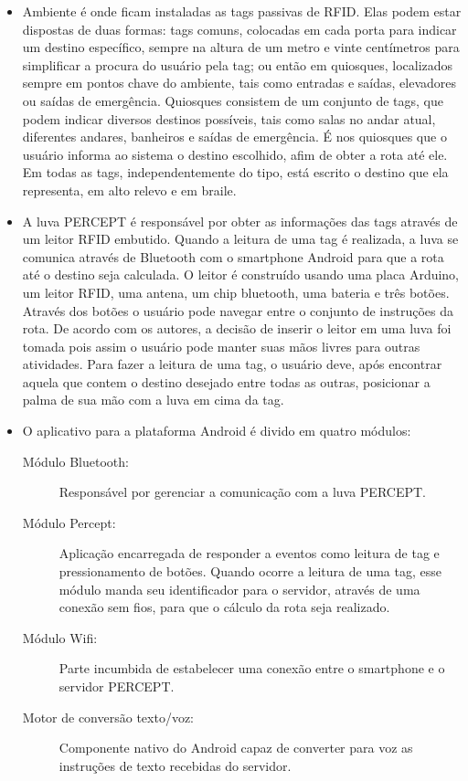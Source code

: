 \documentclass[english,brazilian]{UNISINOSmonografia}
\begin{document}
\begin{itemize}
	\item Ambiente é onde ficam instaladas as tags passivas de RFID. Elas podem estar dispostas de duas formas: tags comuns, colocadas em cada porta para indicar um destino específico, sempre na altura de um metro e vinte centímetros para simplificar a procura do usuário pela tag; ou então em quiosques, localizados sempre em pontos chave do ambiente, tais como entradas e saídas, elevadores ou saídas de emergência. Quiosques consistem de um conjunto de tags, que podem indicar diversos destinos possíveis, tais como salas no andar atual, diferentes andares, banheiros e saídas de emergência. É nos quiosques que o usuário informa ao sistema o destino escolhido, afim de obter a rota até ele. Em todas as tags, independentemente do tipo, está escrito o destino que ela representa, em alto relevo e em braile.
	
	\item A luva PERCEPT é responsável por obter as informações das tags através de um leitor RFID embutido. Quando a leitura de uma tag é realizada, a luva se comunica através de Bluetooth com o smartphone Android para que a rota até o destino seja calculada. O leitor é construído usando uma placa Arduino, um leitor RFID, uma antena, um chip bluetooth, uma bateria e três botões. Através dos botões o usuário pode navegar entre o conjunto de instruções da rota. De acordo com os autores, a decisão de inserir o leitor em uma luva foi tomada pois assim o usuário pode manter suas mãos livres para outras atividades. Para fazer a leitura de uma tag, o usuário deve, após encontrar aquela que contem o destino desejado entre todas as outras, posicionar a palma de sua mão com a luva em cima da tag.

	\item O aplicativo para a plataforma Android é divido em quatro módulos:
	\begin{description}
		\item[Módulo Bluetooth:] Responsável por gerenciar a comunicação com a luva PERCEPT.
		\item[Módulo Percept:] Aplicação encarregada de responder a eventos como leitura de tag e pressionamento de botões. Quando ocorre a leitura de uma tag, esse módulo manda seu identificador para o servidor, através de uma conexão sem fios, para que o cálculo da rota seja realizado.
		\item [Módulo Wifi:] Parte incumbida de estabelecer uma conexão entre o smartphone e o servidor PERCEPT.
		\item [Motor de conversão texto/voz:] Componente nativo do Android capaz de converter para voz as instruções de texto recebidas do servidor.
	\end{description}


\end{itemize}
\end{document}
